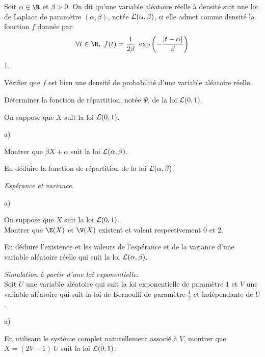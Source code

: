 \noindent 
Soit $\alpha\in\R$ et $\beta>0$. On dit qu'une variable aléatoire
réelle à densité suit une loi de Laplace de paramètre
$(\alpha,\beta)$, notée $\cal L(\alpha,\beta)$, si elle admet comme
densité la fonction $f$ donnée par:
\[
\forall t \in \R, \ f(t) = \dfrac{1}{2{\beta}} \ \exp\left(-
  \dfrac{|t-\alpha|}{\beta} \right)
\]
\begin{noliste}{1.}
  \setlength{\itemsep}{4mm}
\item Vérifier que $f$ est bien une densité de probabilité d'une
  variable aléatoire réelle.
  
  

\item Déterminer la fonction de répartition, notée $\Psi$, de la loi
  ${\cal L}(0,1)$.

  
  
\item On suppose que $X$ suit la loi ${\cal L} (0,1)$.
  
  \begin{noliste}{a)}
    \setlength{\itemsep}{2mm} %
  \item Montrer que $\beta X+\alpha$ suit la loi ${\cal
      L}(\alpha,\beta)$.

    
  
  
  
  
  
  
\item En déduire la fonction de répartition de la loi ${\cal
    L}(\alpha,\beta)$.
  
  
\end{noliste}

\item {\em Espérance et variance.}
  \begin{noliste}{a)}
  \setlength{\itemsep}{2mm} %
  \item On suppose que $X$ suit la loi ${\cal L}(0,1)$.\\
    Montrer que $\E(X)$ et $\V(X)$ existent et valent respectivement
    $0$ et $2$.

    

  \item En déduire l'existence et les valeurs de l'espérance et de la
    variance d'une variable aléatoire réelle qui suit la loi ${\cal
      L}(\alpha,\beta)$.

    
  \end{noliste}

\item {\em Simulation à partir d'une loi exponentielle.}\\
  Soit $U$ une variable aléatoire qui suit la loi exponentielle de
  paramètre $1$ et $V$ une variable aléatoire qui suit la loi de
  Bernoulli de paramètre $\frac{1}{2}$ et indépendante de $U$.
  \begin{noliste}{a)}
    \setlength{\itemsep}{2mm} %
  \item En utilisant le système complet naturellement associé à $V$,
    montrer que $X = (2V-1) \ U$ suit la loi ${\cal L}(0,1)$.


\end{noliste}
\end{noliste}
